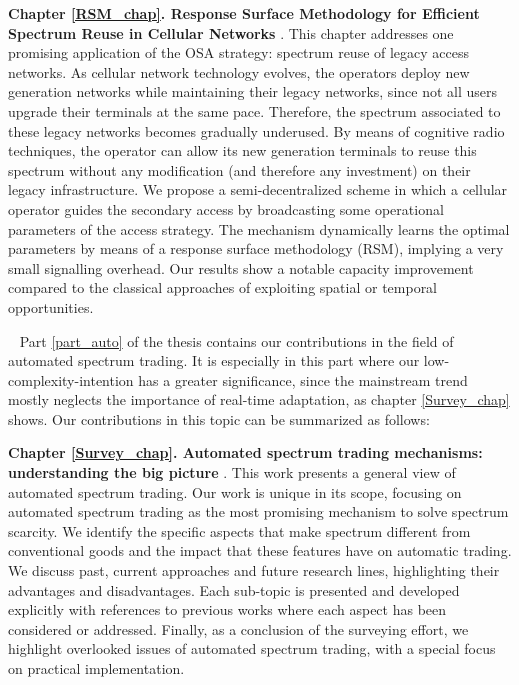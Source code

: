 \textbf{Chapter \ref{RSM_chap}. Response Surface Methodology for Efficient Spectrum Reuse in Cellular Networks} \cite{ref:Alcaraz2014_RSM,ref:Alcaraz2015_RSM}.
This chapter addresses one promising application of the OSA strategy: spectrum reuse of legacy access networks. As cellular network technology evolves, the operators deploy new generation networks while maintaining their legacy networks, since not all users upgrade their terminals at the same pace.
Therefore, the spectrum associated to these legacy networks becomes gradually underused.
By means of cognitive radio techniques, the operator can allow its new generation terminals to reuse this spectrum without any modification (and therefore any investment) on their legacy infrastructure.
We propose a semi-decentralized scheme in which a cellular operator guides the secondary access by broadcasting some operational parameters of the access strategy.
The mechanism dynamically learns the optimal parameters by means of a response surface methodology (RSM), implying a very small signalling overhead.
Our results show a notable capacity improvement compared to the classical approaches of exploiting spatial or temporal opportunities.

~\newline
Part \ref{part_auto} of the thesis contains our contributions in the field of automated spectrum trading. 
It is especially in this part where our low-complexity-intention has a greater significance, since the mainstream trend mostly neglects the importance of real-time adaptation, as chapter \ref{Survey_chap} shows. 
Our contributions in this topic can be summarized as follows:

\textbf{Chapter \ref{Survey_chap}. Automated spectrum trading mechanisms: understanding the big picture} \cite{ref:Mario2014}.
This work presents a general view of automated spectrum trading.
Our work is unique in its scope, focusing on automated spectrum trading as the most promising mechanism to solve spectrum scarcity.
We identify the specific aspects that make spectrum different from conventional goods and the impact that these features have on automatic trading.
We discuss past, current approaches and future research lines, highlighting their advantages and disadvantages. 
Each sub-topic is presented and developed explicitly with references to previous works where each aspect has been considered or addressed.
Finally, as a conclusion of the surveying effort, we highlight overlooked issues of automated spectrum trading, with a special focus on practical implementation.

